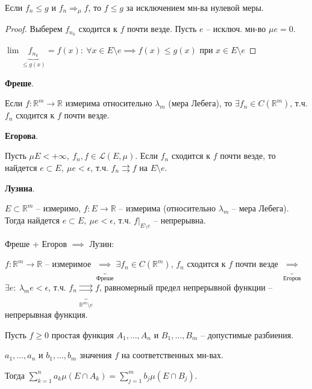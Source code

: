 \begin{consequence}
    Если $f_n \leq g$ и $f_n {\Rightarrow}_{\mu} f$, то $f \leq g$ за исключением мн-ва нулевой меры.
\end{consequence}
\begin{proof}
    Выберем $f_{n_k}$ сходится к $f$ почти везде. Пусть $e$ -- исключ. мн-во $\mu e = 0$.

    $\lim \underbrace{f_{n_k}}_{\leq g(x)} = f(x): \ \forall x \in E \setminus e \implies f(x) \leq g(x)$ при $x \in E \setminus e$
\end{proof}

\begin{theorem}
    \textbf{Фреше}.

    Если $f: \mathbb{R}^{m} \rightarrow \mathbb{R}$ измерима относительно $\lambda_m$ (мера Лебега), то $\exists f_n \in C(\mathbb{R}^m)$, т.ч. $f_n$ сходится к $f$ почти везде.
\end{theorem}


\begin{theorem}
    \textbf{Егорова}.

    Пусть $\mu E < + \infty, \ f_n, f \in \mathscr{L}(E, \mu)$. Если $f_n$ сходится к $f$ почти везде, то найдется $e \subset E, \ \mu e < \epsilon$, т.ч. $f_n \rightrightarrows f$ на $E \setminus e$.
\end{theorem}

\begin{theorem}
    \textbf{Лузина}.

    $E \subset \mathbb{R}^m$ -- измеримо, $f: E \rightarrow \mathbb{R}$  -- измерима (относительно $\lambda_m$ -- мера Лебега). Тогда найдется $e \subset E, \ \mu e < \epsilon$, т.ч. $f|_{E \setminus e}$ -- непрерывна.


    Фреше + Егоров $\implies$ Лузин:

    $f: \mathbb{R}^m \rightarrow \mathbb{R}$ -- измеримое $\underbrace{\implies}_{\text{Фреше}} \exists f_n \in C(\mathbb{R}^m)$, $f_n$ сходится к $f$ почти везде $\underbrace{\implies}_{\text{Егоров}}$ $\exists e: \ \lambda_m e < \epsilon$, т.ч. $f_n \underbrace{\rightrightarrows}_{\mathbb{R}^m \setminus e} f$, равномерный предел непрерывной функции -- непрерывная функция.
\end{theorem}


\begin{lemma}
    Пусть $f \geq 0$ простая функция $A_1, \dots, A_n$ и $B_1, \dots, B_m$ -- допустимые разбиения.

    $a_1, \dots, a_n$ и $b_1, \dots, b_m$ значения $f$ на соответственных мн-вах.

    Тогда $\sum_{k=1}^{n} a_k \mu (E \cap A_k) = \sum_{j=1}^{m} b_j \mu (E \cap B_j)$.
\end{lemma}

